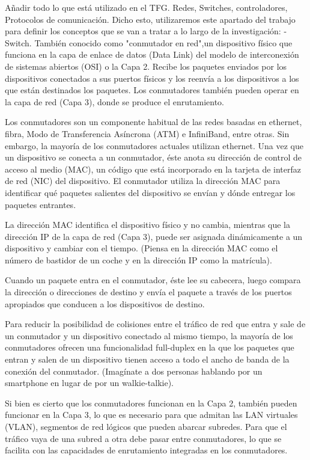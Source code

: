 \documentclass[a4paper, 12pt]{book}
\begin{document}
	Añadir todo lo que está utilizado en el TFG. Redes, Switches, controladores, Protocolos de comunicación.
		Dicho esto, utilizaremos este apartado del trabajo para definir los conceptos que se van a tratar a lo largo de la investigación:
	- Switch. También conocido como "conmutador en red",un dispositivo físico que funciona en la capa de enlace de datos (Data Link) del modelo de interconexión de sistemas abiertos (OSI) o la Capa 2. Recibe los paquetes enviados por los dispositivos conectados a sus puertos físicos y los reenvía a los dispositivos a los que están destinados los paquetes. Los conmutadores también pueden operar en la capa de red (Capa 3), donde se produce el enrutamiento.
	
	Los conmutadores son un componente habitual de las redes basadas en ethernet, fibra, Modo de Transferencia Asíncrona (ATM) e InfiniBand, entre otras. Sin embargo, la mayoría de los conmutadores actuales utilizan ethernet. Una vez que un dispositivo se conecta a un conmutador, éste anota su dirección de control de acceso al medio (MAC), un código que está incorporado en la tarjeta de interfaz de red (NIC) del dispositivo. El conmutador utiliza la dirección MAC para identificar qué paquetes salientes del dispositivo se envían y dónde entregar los paquetes entrantes.
	
	La dirección MAC identifica el dispositivo físico y no cambia, mientras que la dirección IP de la capa de red (Capa 3), puede ser asignada dinámicamente a un dispositivo y cambiar con el tiempo. (Piensa en la dirección MAC como el número de bastidor de un coche y en la dirección IP como la matrícula).
	
	Cuando un paquete entra en el conmutador, éste lee su cabecera, luego compara la dirección o direcciones de destino y envía el paquete a través de los puertos apropiados que conducen a los dispositivos de destino.
	
	Para reducir la posibilidad de colisiones entre el tráfico de red que entra y sale de un conmutador y un dispositivo conectado al mismo tiempo, la mayoría de los conmutadores ofrecen una funcionalidad full-duplex en la que los paquetes que entran y salen de un dispositivo tienen acceso a todo el ancho de banda de la conexión del conmutador. (Imagínate a dos personas hablando por un smartphone en lugar de por un walkie-talkie).
	
	Si bien es cierto que los conmutadores funcionan en la Capa 2, también pueden funcionar en la Capa 3, lo que es necesario para que admitan las LAN virtuales (VLAN), segmentos de red lógicos que pueden abarcar subredes. Para que el tráfico vaya de una subred a otra debe pasar entre conmutadores, lo que se facilita con las capacidades de enrutamiento integradas en los conmutadores. 
	
\end{document}
